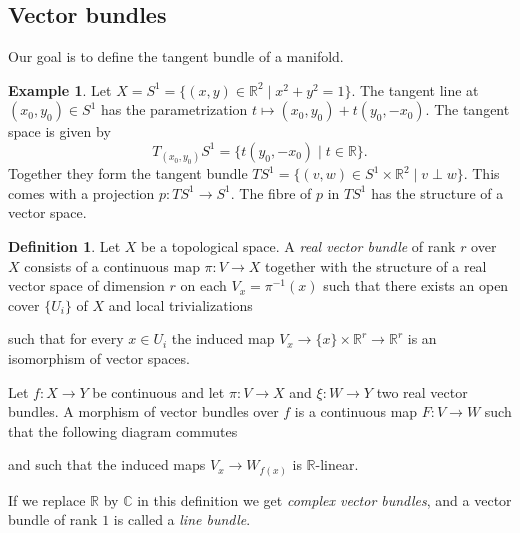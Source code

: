 \documentclass[11pt,A4]{article}
\theoremstyle{plain}
\theoremstyle{definition}
\newtheorem{defn}[thm]{Definition}
\newtheorem{exa}[thm]{Example}
\theoremstyle{remark}
\newcommand{\R}{\mathbb{R}}
\newcommand{\1}{\mathbbm{1}}
\newcommand{\C}{\mathbb{C}}
\begin{document}
\subsection{Vector bundles}

Our goal is to define the tangent bundle of a manifold.

\begin{exa}
    Let $X=S^{1}=\{(x,y)\in \R^{2}\mid x^{2}+y^{2}=1\}$.
    The tangent line at $(x_{0},y_{0})\in S^{1}$ has the parametrization $t\mapsto (x_{0},y_{0})+t(y_{0},-x_{0})$.
    The tangent space is given by
    \[ T_{(x_{0},y_{0})}S^{1}=\{ t(y_{0},-x_{0})\mid t\in \R\}.\]
    Together they form the tangent bundle $TS^{1}=\{(v,w)\in S^{1}\times \R^{2}\mid v\perp w\}$.
    This comes with a projection $p\colon TS^{1}\to S^{1}$.
    The fibre of $p$ in $TS^{1}$ has the structure of a vector space.
\end{exa}

\begin{defn}
    Let $X$ be a topological space.
    A \textit{real vector bundle} of rank $r$ over $X$ consists of a continuous map $\pi\colon V\to X$ together with the structure of a real vector space of dimension $r$ on each $V_{x}=\pi^{-1}(x)$ such that there exists an open cover $\{U_{i}\}$ of $X$ and local trivializations
    \begin{center}
    \end{center}
    such that for every $x\in U_{i}$ the induced map $V_{x}\to \{x\}\times \R^{r}\to \R^{r}$ is an isomorphism of vector spaces.

    Let $f\colon X\to Y$ be continuous and let $\pi\colon V\to X$ and $\xi\colon W\to Y$ two real vector bundles.
    A morphism of vector bundles over $f$ is a continuous map $F\colon V\to W$ such that the following diagram commutes
    \begin{center}
    \end{center}
    and such that the induced maps $V_{x}\to W_{f(x)}$ is $\R$-linear.
    
    If we replace $\R$ by $\C$ in this definition we get \textit{complex vector bundles}, and a vector bundle of rank $1$ is called a \textit{line bundle}.
\end{defn}
\end{document}
